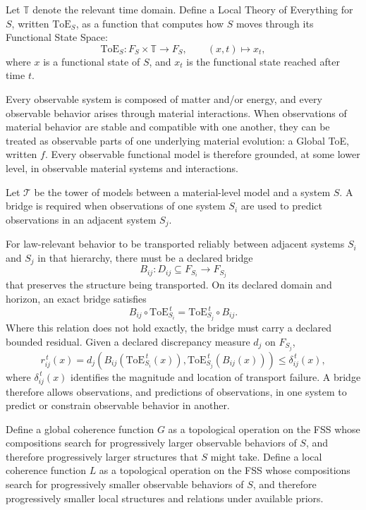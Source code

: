 \documentclass[11pt]{article}
\theoremstyle{definition}
\begin{document}
Let $\mathbb{T}$ denote the relevant time domain. Define a Local Theory of Everything for $S$, written $\mathrm{ToE}_S$, as a function that computes how $S$ moves through its Functional State Space:
\[
\mathrm{ToE}_S : F_S \times \mathbb{T} \rightarrow F_S,
\qquad
(x,t) \mapsto x_t,
\]
where $x$ is a functional state of $S$, and $x_t$ is the functional state reached after time $t$.

Every observable system is composed of matter and/or energy, and every observable behavior arises through material interactions. When observations of material behavior are stable and compatible with one another, they can be treated as observable parts of one underlying material evolution: a Global ToE, written $f$. Every observable functional model is therefore grounded, at some lower level, in observable material systems and interactions.

Let $\mathcal{T}$ be the tower of models between a material-level model and a system $S$. A bridge is required when observations of one system $S_i$ are used to predict observations in an adjacent system $S_j$.

For law-relevant behavior to be transported reliably between adjacent systems $S_i$ and $S_j$ in that hierarchy, there must be a declared bridge
\[
B_{ij} : D_{ij} \subseteq F_{S_i} \rightarrow F_{S_j}
\]
that preserves the structure being transported. On its declared domain and horizon, an exact bridge satisfies
\[
B_{ij} \circ \mathrm{ToE}_{S_i}^{\,t}
=
\mathrm{ToE}_{S_j}^{\,t} \circ B_{ij}.
\]
Where this relation does not hold exactly, the bridge must carry a declared bounded residual. Given a declared discrepancy measure $d_j$ on $F_{S_j}$,
\[
r_{ij}^{\,t}(x)
=
d_j\!\left(
B_{ij}\!\left(\mathrm{ToE}_{S_i}^{\,t}(x)\right),
\mathrm{ToE}_{S_j}^{\,t}\!\left(B_{ij}(x)\right)
\right)
\leq
\delta_{ij}^{\,t}(x),
\]
where $\delta_{ij}^{\,t}(x)$ identifies the magnitude and location of transport failure. A bridge therefore allows observations, and predictions of observations, in one system to predict or constrain observable behavior in another.

Define a global coherence function $G$ as a topological operation on the FSS whose compositions search for progressively larger observable behaviors of $S$, and therefore progressively larger structures that $S$ might take. Define a local coherence function $L$ as a topological operation on the FSS whose compositions search for progressively smaller observable behaviors of $S$, and therefore progressively smaller local structures and relations under available priors.
\end{document}
